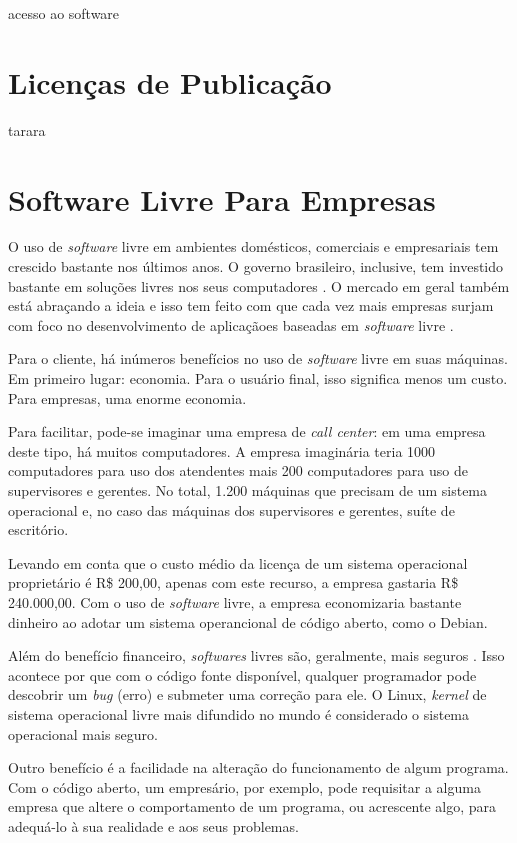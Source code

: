 \documentclass{classe_cn}                 %
\begin{document}
acesso ao software

\section{Licenças de Publicação}

tarara

\section{Software Livre Para Empresas}

O uso de \textit{software} livre em ambientes domésticos, comerciais e empresariais tem crescido bastante nos últimos anos. O governo brasileiro, inclusive, tem investido bastante em soluções livres nos seus computadores \cite{Jose:2016}. O mercado em geral também está abraçando a ideia e isso tem feito com que cada vez mais empresas surjam com foco no desenvolvimento de aplicaçãoes baseadas em \textit{software} livre \cite{Hecker:2016}.

Para o cliente, há inúmeros benefícios no uso de \textit{software} livre em suas máquinas. Em primeiro lugar: economia. Para o usuário final, isso significa menos um custo. Para empresas, uma enorme economia.

Para facilitar, pode-se imaginar uma empresa de \textit{call center}: em uma empresa deste tipo, há muitos computadores. A empresa imaginária teria 1000 computadores para uso dos atendentes mais 200 computadores para uso de supervisores e gerentes. No total, 1.200 máquinas que precisam de um sistema operacional e, no caso das máquinas dos supervisores e gerentes, suíte de escritório.

Levando em conta que o custo médio da licença de um sistema operacional proprietário é R\$ 200,00, apenas com este recurso, a empresa gastaria R\$ 240.000,00. Com o uso de \textit{software} livre, a empresa economizaria bastante dinheiro ao adotar um sistema operancional de código aberto, como o Debian.

Além do benefício financeiro, \textit{softwares} livres são, geralmente, mais seguros \cite{Castro}. Isso acontece por que com o código fonte disponível, qualquer programador pode descobrir um \textit{bug} (erro) e submeter uma correção para ele. O Linux, \textit{kernel} de sistema operacional livre mais difundido no mundo é considerado o sistema operacional mais seguro.

Outro benefício é a facilidade na alteração do funcionamento de algum programa. Com o código aberto, um empresário, por exemplo, pode requisitar a alguma empresa que altere o comportamento de um programa, ou acrescente algo, para adequá-lo à sua realidade e aos seus problemas.
\end{document}

